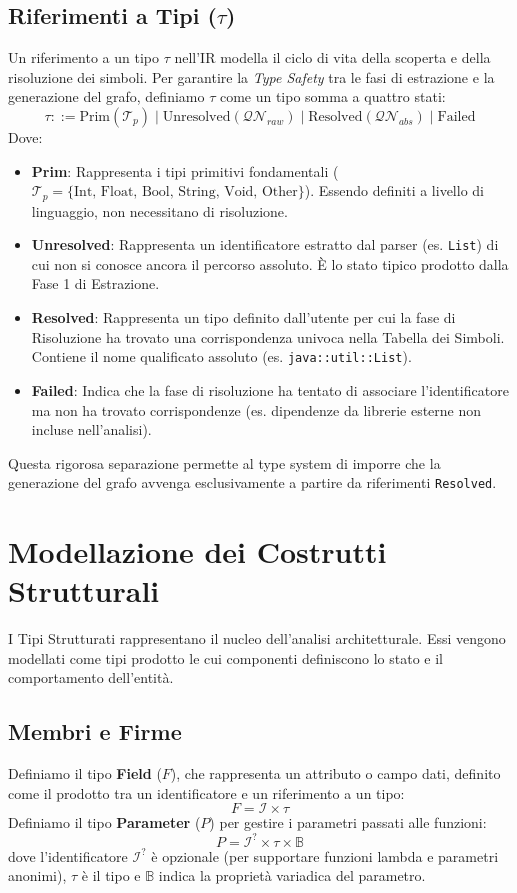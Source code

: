 \subsection{Riferimenti a Tipi ($\tau$)}
Un riferimento a un tipo $\tau$ nell'IR modella il ciclo di vita
della scoperta e della risoluzione dei simboli. Per garantire la
\textit{Type Safety} tra le fasi di estrazione e la generazione del
grafo, definiamo $\tau$ come un tipo somma a quattro stati:
$$\tau ::= \text{Prim}(\mathcal{T}_{p}) \mid
\text{Unresolved}(\mathcal{QN}_{raw}) \mid
\text{Resolved}(\mathcal{QN}_{abs}) \mid \text{Failed}$$
Dove:
\begin{itemize}
  \item \textbf{Prim}: Rappresenta i tipi primitivi fondamentali
    ($\mathcal{T}_{p} = \{ \text{Int, Float, Bool, String, Void,
    Other} \}$). Essendo definiti a livello di linguaggio, non
    necessitano di risoluzione.
  \item \textbf{Unresolved}: Rappresenta un identificatore estratto
    dal parser (es. \texttt{List}) di cui non si conosce ancora il
    percorso assoluto. È lo stato tipico prodotto dalla Fase 1 di Estrazione.
  \item \textbf{Resolved}: Rappresenta un tipo definito dall'utente
    per cui la fase di Risoluzione ha trovato una corrispondenza
    univoca nella Tabella dei Simboli. Contiene il nome qualificato
    assoluto (es. \texttt{java::util::List}).
  \item \textbf{Failed}: Indica che la fase di risoluzione ha tentato
    di associare l'identificatore ma non ha trovato corrispondenze
    (es. dipendenze da librerie esterne non incluse nell'analisi).
\end{itemize}
Questa rigorosa separazione permette al type system di imporre che la
generazione del grafo avvenga esclusivamente a partire da riferimenti
\texttt{Resolved}.

\section{Modellazione dei Costrutti Strutturali}
I Tipi Strutturati rappresentano il nucleo dell'analisi
architetturale. Essi vengono modellati come tipi prodotto le cui
componenti definiscono lo stato e il comportamento dell'entità.

\subsection{Membri e Firme}
Definiamo il tipo \textbf{Field} ($F$), che rappresenta un attributo
o campo dati, definito come il prodotto tra un identificatore e un
riferimento a un tipo:
$$F = \mathcal{I} \times \tau$$
Definiamo il tipo \textbf{Parameter} ($P$) per gestire i parametri
passati alle funzioni:
$$P = \mathcal{I}^? \times \tau \times \mathbb{B}$$ dove
l'identificatore $\mathcal{I}^?$ è opzionale (per supportare funzioni
lambda e parametri anonimi), $\tau$ è il tipo e $\mathbb{B}$ indica
la proprietà variadica del parametro.

